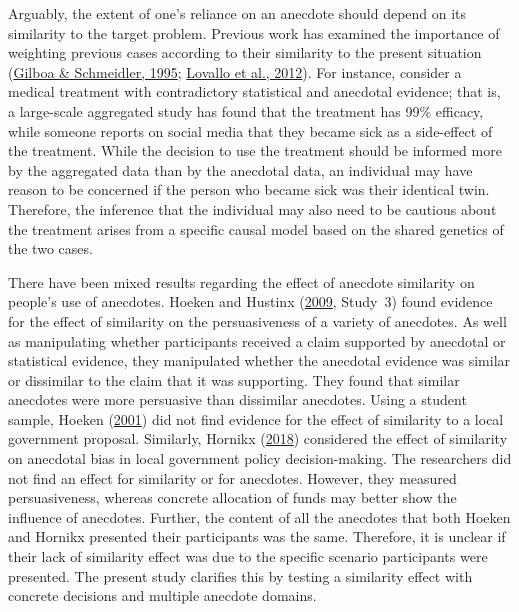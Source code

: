 \documentclass[
  man, donotrepeattitle,floatsintext]{apa7}
\theoremstyle{definition}
\theoremstyle{definition}
\theoremstyle{definition}
\theoremstyle{definition}
\theoremstyle{remark}
\begin{document}
Arguably, the extent of one's reliance on an anecdote should depend on its
similarity to the target problem. Previous work has examined the importance of
weighting previous cases according to their similarity to the present situation
(\protect\hyperlink{ref-gilboa1995}{Gilboa \& Schmeidler, 1995}; \protect\hyperlink{ref-lovallo2012}{Lovallo et al., 2012}). For instance, consider a medical treatment with
contradictory statistical and anecdotal evidence; that is, a large-scale
aggregated study has found that the treatment has 99\% efficacy, while someone
reports on social media that they became sick as a side-effect of the treatment.
While the decision to use the treatment should be informed more by the
aggregated data than by the anecdotal data, an individual may have reason to be
concerned if the person who became sick was their identical twin. Therefore, the
inference that the individual may also need to be cautious about the treatment
arises from a specific causal model based on the shared genetics of the two
cases.

There have been mixed results regarding the effect of anecdote similarity on
people's use of anecdotes. Hoeken and Hustinx (\protect\hyperlink{ref-hoeken2009}{2009}, Study~3) found evidence for the effect
of similarity on the persuasiveness of a variety of anecdotes. As well as
manipulating whether participants received a claim supported by anecdotal or
statistical evidence, they manipulated whether the anecdotal evidence was
similar or dissimilar to the claim that it was supporting. They found that
similar anecdotes were more persuasive than dissimilar anecdotes. Using a
student sample, Hoeken (\protect\hyperlink{ref-hoeken2001}{2001}) did not find evidence for the effect of similarity
to a local government proposal. Similarly, Hornikx (\protect\hyperlink{ref-hornikx2018}{2018}) considered the effect of
similarity on anecdotal bias in local government policy decision-making. The
researchers did not find an effect for similarity or for anecdotes. However,
they measured persuasiveness, whereas concrete allocation of funds may better
show the influence of anecdotes. Further, the content of all the anecdotes that
both Hoeken and Hornikx presented their participants was the same. Therefore, it
is unclear if their lack of similarity effect was due to the specific scenario
participants were presented. The present study clarifies this by testing a
similarity effect with concrete decisions and multiple anecdote domains.
\end{document}
